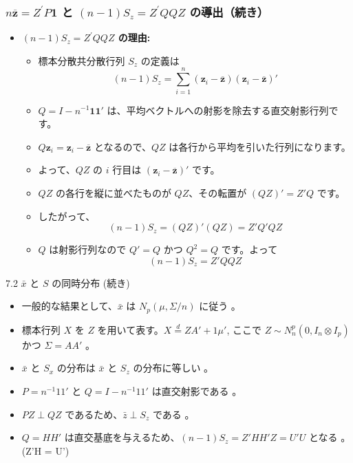 \documentclass[aspectratio=169]{beamer}
\begin{document}
\begin{frame}
\frametitle{$n\overline{\bm{z}}=Z^{\prime}P\bm{1}$ と $(n-1)S_z=Z^{\prime}QQZ$ の導出（続き）}
\begin{itemize}
    \item \textbf{$(n-1)S_z=Z^{\prime}QQZ$ の理由:}
    \begin{itemize}
        \item 標本分散共分散行列 $S_z$ の定義は
        \[
        (n-1)S_z = \sum_{i=1}^{n} (\bm{z}_i - \overline{\bm{z}})(\bm{z}_i - \overline{\bm{z}})'
        \]
        \item $Q = I - n^{-1}\bm{1}\bm{1}'$ は、平均ベクトルへの射影を除去する直交射影行列です。
        \item $Q\bm{z}_i = \bm{z}_i - \overline{\bm{z}}$ となるので、$QZ$ は各行から平均を引いた行列になります。
        \item よって、$QZ$ の $i$ 行目は $(\bm{z}_i - \overline{\bm{z}})'$ です。
        \item $QZ$ の各行を縦に並べたものが $QZ$、その転置が $(QZ)' = Z'Q$ です。
        \item したがって、
        \[
        (n-1)S_z = (QZ)'(QZ) = Z'Q'QZ
        \]
        \item $Q$ は射影行列なので $Q' = Q$ かつ $Q^2 = Q$ です。よって
        \[
        (n-1)S_z = Z'QQZ
        \]
    \end{itemize}
\end{itemize}
\end{frame}

\begin{frame}{7.2 $\bar{x}$ と $S$ の同時分布 (続き)}
\begin{itemize}
    \item 一般的な結果として、$\bar{x}$ は $N_p(\mu, \Sigma/n)$ に従う 。
    \item 標本行列 $X$ を $Z$ を用いて表す。$X \overset{d}{=} ZA' + 1\mu'$, ここで $Z \sim N_n^p(0, I_n \otimes I_p)$ かつ $\Sigma=AA'$ 。
    \item $\bar{x}$ と $S_x$ の分布は $\bar{x}$ と $S_z$ の分布に等しい 。
    \item $P=n^{-1}11'$ と $Q=I-n^{-1}11'$ は直交射影である 。
    \item $PZ \perp QZ$ であるため、$\bar{z} \perp S_z$ である 。
    \item $Q=HH'$ は直交基底を与えるため、$(n-1)S_z = Z'HH'Z = U'U$ となる 。\\
    (Z'H = U')
\end{itemize}
\end{frame}
\end{document}
